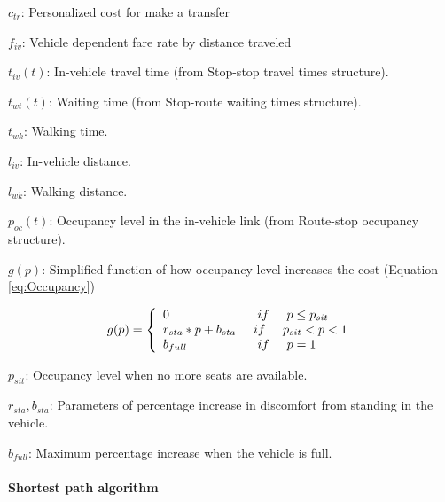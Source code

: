 $c_{tr}$: Personalized cost for make a transfer

$f_{iv}$: Vehicle dependent fare rate by distance traveled

$t_{iv}(t)$: In-vehicle travel time (from Stop-stop travel times structure).

$t_{wt}(t)$: Waiting time (from Stop-route waiting times structure).

$t_{wk}$: Walking time.

$l_{iv}$: In-vehicle distance.

$l_{wk}$: Walking distance.

$p_{oc}(t)$: Occupancy level in the in-vehicle link (from Route-stop occupancy structure).

$g(p)$: Simplified function of how occupancy level increases the cost (Equation \ref{eq:Occupancy})

\begin{equation}\label{eq:Occupancy}
	g(p)=\left\{\begin{array}{l}
	0\hspace{25 mm}if\hspace{5 mm}p \leq p_{sit} \\
	r_{sta}*p + b_{sta}\hspace{5 mm} if\hspace{5 mm}p_{sit}<p<1\\
	b_{full}\hspace{20 mm} if\hspace{5 mm}p=1
	\end{array}\right.
\end{equation}

$p_{sit}$: Occupancy level when no more seats are available.

$r_{sta}, b_{sta}$: Parameters of percentage increase in discomfort from standing in the vehicle.

$b_{full}$: Maximum percentage increase when the vehicle is full.

\paragraph{Shortest path algorithm}

